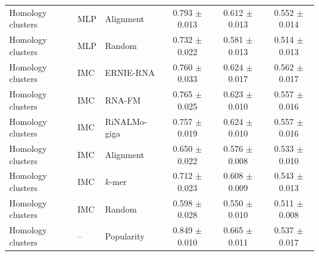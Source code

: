 \begin{longtable}{lllccc}
Homology clusters & MLP & Alignment & 0.793 $\pm$ 0.013 & 0.612 $\pm$ 0.013 & 0.552 $\pm$ 0.014\\
Homology clusters & MLP & Random & 0.732 $\pm$ 0.022 & 0.581 $\pm$ 0.013 & 0.514 $\pm$ 0.013\\
Homology clusters & IMC & ERNIE-RNA & 0.760 $\pm$ 0.033 & 0.624 $\pm$ 0.017 & 0.562 $\pm$ 0.017\\
Homology clusters & IMC & RNA-FM & 0.765 $\pm$ 0.025 & 0.623 $\pm$ 0.010 & 0.557 $\pm$ 0.016\\
Homology clusters & IMC & RiNALMo-giga & 0.757 $\pm$ 0.019 & 0.624 $\pm$ 0.010 & 0.557 $\pm$ 0.016\\
Homology clusters & IMC & Alignment & 0.650 $\pm$ 0.022 & 0.576 $\pm$ 0.008 & 0.533 $\pm$ 0.010\\
Homology clusters & IMC & $k$-mer & 0.712 $\pm$ 0.023 & 0.608 $\pm$ 0.009 & 0.543 $\pm$ 0.013\\
Homology clusters & IMC & Random & 0.598 $\pm$ 0.028 & 0.550 $\pm$ 0.010 & 0.511 $\pm$ 0.008\\
Homology clusters & -- & Popularity & 0.849 $\pm$ 0.010 & 0.665 $\pm$ 0.011 & 0.537 $\pm$ 0.017\\
\bottomrule
\end{longtable}
